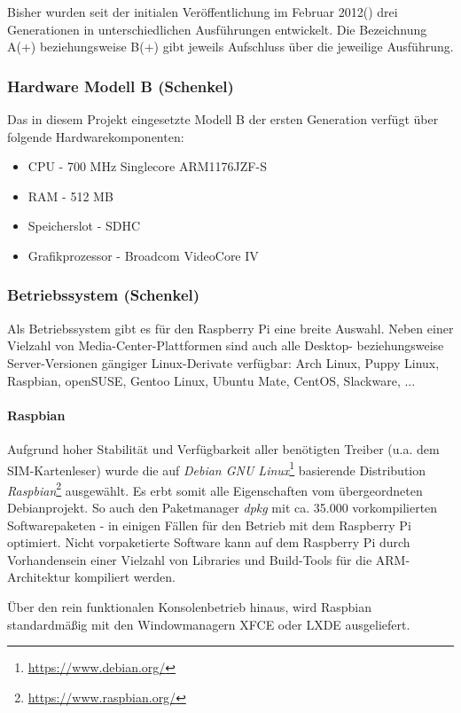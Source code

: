 Bisher wurden seit der initialen Veröffentlichung im Februar 2012(\cite{rasppifoundweb})
drei Generationen in unterschiedlichen Ausführungen
entwickelt. Die Bezeichnung A(+) beziehungsweise B(+) gibt jeweils Aufschluss
über die jeweilige Ausführung.

\subsubsection{Hardware Modell B (Schenkel)}
Das in diesem Projekt eingesetzte Modell B der ersten Generation verfügt über folgende Hardwarekomponenten:
\begin{itemize}
\item CPU - 700 MHz Singlecore ARM1176JZF-S
\item RAM - 512 MB
\item Speicherslot - SDHC
\item Grafikprozessor - Broadcom VideoCore IV
\end{itemize}

\subsubsection{Betriebssystem (Schenkel)}
Als Betriebssystem gibt es für den Raspberry Pi eine breite Auswahl.
Neben einer Vielzahl von Media-Center-Plattformen sind auch alle
Desktop- beziehungsweise Server-Versionen gängiger Linux-Derivate verfügbar:
Arch Linux, Puppy Linux, Raspbian, openSUSE, Gentoo Linux, Ubuntu Mate,
CentOS, Slackware, ...

\paragraph{Raspbian}
Aufgrund hoher Stabilität und Verfügbarkeit aller benötigten Treiber
(u.a. dem SIM-Kartenleser) wurde die auf \textit{Debian GNU Linux}\footnote{\url{https://www.debian.org/}}
basierende Distribution \textit{Raspbian}\footnote{\url{https://www.raspbian.org/}} ausgewählt.
Es erbt somit alle Eigenschaften vom übergeordneten Debianprojekt.
So auch den Paketmanager \textit{dpkg} mit ca. 35.000 vorkompilierten
Softwarepaketen - in einigen Fällen für den Betrieb mit dem
Raspberry Pi optimiert. Nicht vorpaketierte Software kann auf dem Raspberry
Pi durch Vorhandensein einer Vielzahl von Libraries und Build-Tools
für die ARM-Architektur kompiliert werden.

Über den rein funktionalen Konsolenbetrieb hinaus, wird Raspbian standardmäßig mit den
Windowmanagern XFCE oder LXDE ausgeliefert.

